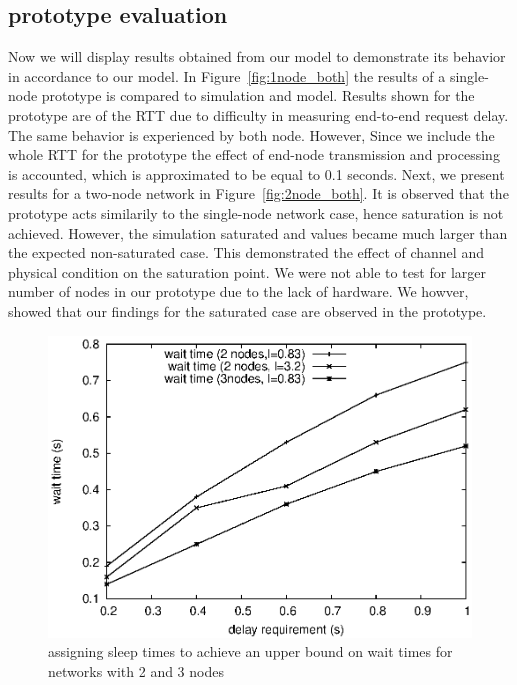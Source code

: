 \subsection{prototype evaluation}
Now we will display results obtained from our model to demonstrate its behavior in accordance to our model. In Figure~\ref{fig:1node_both} the results of a single-node prototype is compared to simulation and model. Results shown for the prototype are of the RTT due to difficulty in measuring end-to-end request delay. The same behavior is experienced by both node. However, Since we include the whole RTT for the prototype the effect of end-node transmission and processing is accounted, which is approximated to be equal to 0.1 seconds. Next, we present results for a two-node network in Figure~\ref{fig:2node_both}. It is observed that the prototype acts similarily to the single-node network case, hence saturation is not achieved. However, the simulation saturated and values became much larger than the expected non-saturated case. This demonstrated the effect of channel and physical condition on the saturation point. We were not able to test for larger number of nodes in our prototype due to the lack of hardware. We howver, showed that our findings for the saturated case are observed in the prototype.

\begin{figure}[t]
\centering
\includegraphics[scale=0.65]{figures/test_2nodes.eps}
\caption{assigning sleep times to achieve an upper bound on wait times for networks with 2 and 3 nodes}
\label{fig:test_2nodes}
\end{figure}

